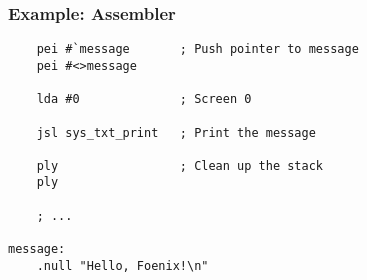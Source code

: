 \subsubsection*{Example: Assembler}
\begin{verbatim}
    pei #`message       ; Push pointer to message
    pei #<>message

    lda #0              ; Screen 0

    jsl sys_txt_print   ; Print the message

    ply                 ; Clean up the stack
    ply

    ; ...

message:
    .null "Hello, Foenix!\n"
\end{verbatim}